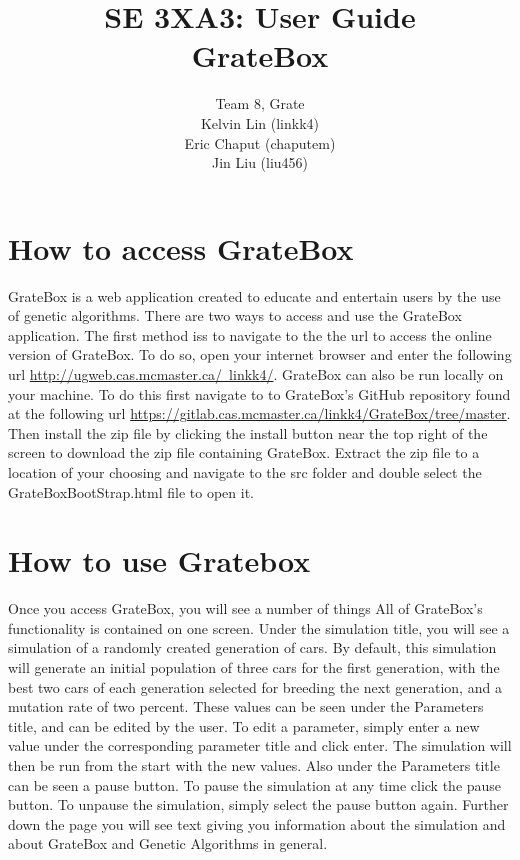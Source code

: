 \documentclass{article}
\title{SE 3XA3: User Guide\\GrateBox}
\author{Team 8, Grate
		\\ Kelvin Lin (linkk4)
		\\ Eric Chaput (chaputem)
		\\ Jin Liu (liu456)
}
\date{}
\begin{document}
\newpage

\maketitle

\section{How to access GrateBox}

GrateBox is a web application created to educate and entertain users by the use of genetic algorithms. There are two ways to access and use the GrateBox application. The first method iss to navigate to the the url to access the online version of GrateBox. To do so, open your internet browser and enter the following url \href{http://ugweb.cas.mcmaster.ca/~linkk4/}{http://ugweb.cas.mcmaster.ca/~linkk4/}. GrateBox can also be run locally on your machine. To do this first navigate to to GrateBox's GitHub repository found at the following url \href{https://gitlab.cas.mcmaster.ca/linkk4/GrateBox/tree/master}{https://gitlab.cas.mcmaster.ca/linkk4/GrateBox/tree/master}. Then install the zip file by clicking the install button near the top right of the screen to download the zip file containing GrateBox. Extract the zip file to a location of your choosing and navigate to the src folder and double select the GrateBoxBootStrap.html file to open it.

\section {How to use Gratebox}

Once you access GrateBox, you will see a number of things All of GrateBox's functionality is contained on one screen. Under the simulation title, you will see a simulation of a randomly created generation of cars. By default, this simulation will generate an initial population of three cars for the first generation, with the best two cars of each generation selected for breeding the next generation, and a mutation rate of two percent. These values can be seen under the Parameters title, and can be edited by the user. To edit a parameter, simply enter a new value under the corresponding parameter title and click enter. The simulation will then be run from the start with the new values. Also under the Parameters title can be seen a pause button. To pause the simulation at any time click the pause button. To unpause the simulation, simply select the pause button again. Further down the page you will see text giving you information about the simulation and about GrateBox and Genetic Algorithms in general.
\end{document}
